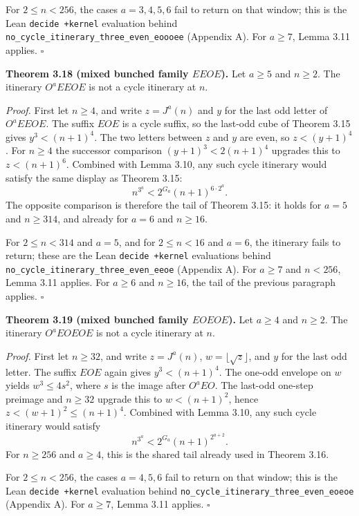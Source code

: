 \documentclass[12pt]{article}
\begin{document}
For \(2\le n<256\), the cases \(a=3,4,5,6\) fail to return on that
window; this is the Lean \texttt{decide\ +kernel} evaluation behind
\texttt{\nolinkurl{no_cycle_itinerary_three_even_eoooee}} (Appendix A).
For \(a\ge 7\), Lemma 3.11 applies. \(\square\)

\textbf{Theorem 3.18 (mixed bunched family \(EEOE\)).} Let \(a\ge 5\)
and \(n\ge 2\). The itinerary \(O^aEEOE\) is not a cycle itinerary at
\(n\).

\emph{Proof.} First let \(n\ge 4\), and write \(z=J^a(n)\) and \(y\) for
the last odd letter of \(O^aEEOE\). The suffix \(EOE\) is a cycle
suffix, so the last-odd cube of Theorem 3.15 gives \(y^3<(n+1)^4\). The
two letters between \(z\) and \(y\) are even, so \(z<(y+1)^4\). For
\(n\ge 4\) the successor comparison \((y+1)^3<2(n+1)^4\) upgrades this
to \(z<(n+1)^6\). Combined with Lemma 3.10, any such cycle itinerary
would satisfy the same display as Theorem 3.15: \[
n^{3^a}<2^{G_a}(n+1)^{6\cdot 2^a}.
\] The opposite comparison is therefore the tail of Theorem 3.15: it
holds for \(a=5\) and \(n\ge 314\), and already for \(a=6\) and
\(n\ge 16\).

For \(2\le n<314\) and \(a=5\), and for \(2\le n<16\) and \(a=6\), the
itinerary fails to return; these are the Lean \texttt{decide\ +kernel}
evaluations behind
\texttt{\nolinkurl{no_cycle_itinerary_three_even_eeoe}} (Appendix A).
For \(a\ge 7\) and \(n<256\), Lemma 3.11 applies. For \(a\ge 6\) and
\(n\ge 16\), the tail of the previous paragraph applies. \(\square\)

\textbf{Theorem 3.19 (mixed bunched family \(EOEOE\)).} Let \(a\ge 4\)
and \(n\ge 2\). The itinerary \(O^aEOEOE\) is not a cycle itinerary at
\(n\).

\emph{Proof.} First let \(n\ge 32\), and write \(z=J^a(n)\),
\(w=\lfloor\sqrt z\rfloor\), and \(y\) for the last odd letter. The
suffix \(EOE\) again gives \(y^3<(n+1)^4\). The one-odd envelope on
\(w\) yields \(w^3\le 4s^2\), where \(s\) is the image after \(O^aEO\).
The last-odd one-step preimage and \(n\ge 32\) upgrade this to
\(w<(n+1)^2\), hence \(z<(w+1)^2\le(n+1)^4\). Combined with Lemma 3.10,
any such cycle itinerary would satisfy \[
n^{3^a}<2^{G_a}(n+1)^{2^{a+2}}.
\] For \(n\ge 256\) and \(a\ge 4\), this is the shared tail already used
in Theorem 3.16.

For \(2\le n<256\), the cases \(a=4,5,6\) fail to return on that window;
this is the Lean \texttt{decide\ +kernel} evaluation behind
\texttt{\nolinkurl{no_cycle_itinerary_three_even_eoeoe}} (Appendix A).
For \(a\ge 7\), Lemma 3.11 applies. \(\square\)
\end{document}
